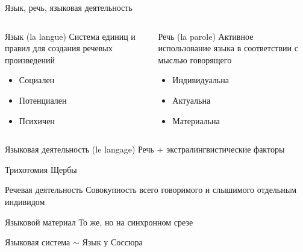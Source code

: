 \begin{frame}{Язык, речь, языковая деятельность}
    \begin{columns}
        \begin{block}{Язык (la langue)}
            Система единиц и правил для создания речевых произведений
            \begin{itemize}
                \item Социален
                \item Потенциален
                \item Психичен
            \end{itemize}
        \end{block}

        \begin{block}{Речь (la parole)}
            Активное использование языка в соответствии с мыслью говорящего
            \begin{itemize}
                \item Индивидуальна
                \item Актуальна
                \item Материальна
            \end{itemize}
        \end{block}
    \end{columns}

    \vfill

    \begin{block}{Языковая деятельность (le langage)}
        Речь $+$ экстралингвистические факторы
    \end{block}
\end{frame}

\begin{frame}{Трихотомия Щербы}
    \begin{block}{Речевая деятельность}
        Совокупность всего говоримого и слышимого отдельным индивидом
    \end{block}

    \begin{block}{Языковой материал}
        То же, но на синхронном срезе
    \end{block}

    \begin{block}{Языковая система}
        $\sim$ Язык у Соссюра
    \end{block}
\end{frame}

